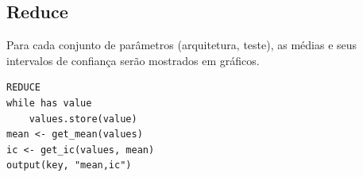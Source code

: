\documentclass{beamer}
\begin{document}
\subsection{Reduce}
\begin{frame}[fragile]
Para cada conjunto de parâmetros (arquitetura, teste), as médias e seus intervalos de confiança serão mostrados em gráficos.

\begin{verbatim}
REDUCE
while has value
    values.store(value)
mean <- get_mean(values)
ic <- get_ic(values, mean)
output(key, "mean,ic")
\end{verbatim}
\end{frame}
\end{document}
